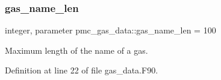\subsubsection{\texorpdfstring{gas\+\_\+name\+\_\+len}{gas\_name\_len}}
{\footnotesize\ttfamily integer, parameter pmc\+\_\+gas\+\_\+data\+::gas\+\_\+name\+\_\+len = 100}



Maximum length of the name of a gas. 



Definition at line 22 of file gas\+\_\+data.\+F90.

